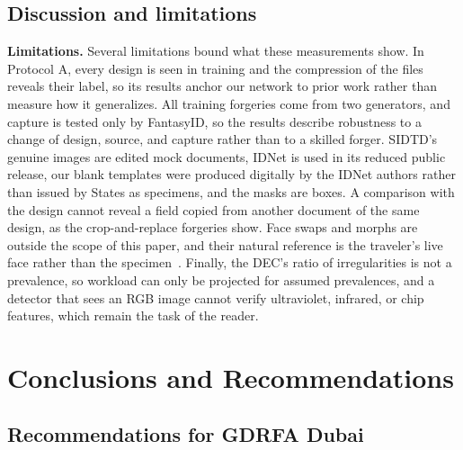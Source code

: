 \documentclass[12pt,a4paper]{article}
\newif\ifshowguidance
\newcommand{\todo}[1]{\ifshowguidance\leavevmode{\color{gray}\itshape [#1]}\fi}
\begin{document}
\subsection{Discussion and limitations}
\todo{Discussion of the results across protocols once Protocols B, C, and D are in.}

\textbf{Limitations.} Several limitations bound what these measurements show. In Protocol A, every design is seen in training and the compression of the files reveals their label, so its results anchor our network to prior work rather than measure how it generalizes. All training forgeries come from two generators, and capture is tested only by FantasyID, so the results describe robustness to a change of design, source, and capture rather than to a skilled forger. SIDTD's genuine images are edited mock documents, IDNet is used in its reduced public release, our blank templates were produced digitally by the IDNet authors rather than issued by States as specimens, and the masks are boxes. A comparison with the design cannot reveal a field copied from another document of the same design, as the crop-and-replace forgeries show. Face swaps and morphs are outside the scope of this paper, and their natural reference is the traveler's live face rather than the specimen~\cite{scherhag2020dmad}. Finally, the DEC's ratio of irregularities is not a prevalence, so workload can only be projected for assumed prevalences, and a detector that sees an RGB image cannot verify ultraviolet, infrared, or chip features, which remain the task of the reader.

\section{Conclusions and Recommendations}
\label{sec:conclusions}
\todo{About 450 words. Conclusions tied to RQ1 to RQ5 and the results tables.}

\subsection*{Recommendations for GDRFA Dubai}
\todo{Each recommendation must follow from a result (evaluation criterion 7). Deployment: the measured CPU time supports running the detector on the existing counter computer beside the reader; quantization and execution on the scanner itself are future work. For example: request cross-design error rates from the reader vendor using the released protocol; calibrate the threshold on the Center's own template library; pilot the detector as a referral suggestion beside the existing checks; track referral and confirmed-hit rates per design as a KPI.}
\end{document}
